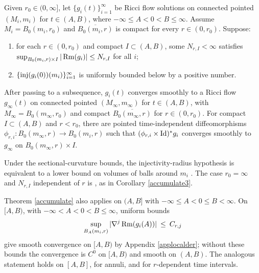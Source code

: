 \begin{theorem}
  \label{thm:kl-convergent-subsequences-ricci-flow-solutions-existence-convergent-subsequences-ricci-flow-solutions}
\label{accumulate}

Given $r_0\in(0,\infty]$, let $\{g_i(t)\}_{i=1}^\infty$ be Ricci flow
solutions on connected pointed $(M_i,m_i)$ for
$t\in(A,B)$, where $-\infty\leq A<0<B\leq\infty$. Assume
$M_i=B_0(m_i,r_0)$ and $\overline{B_0(m_i,r)}$ is compact for every
$r\in(0,r_0)$. Suppose:
\begin{enumerate}
\item for each $r\in(0,r_0)$ and compact $I\subset(A,B)$, some
$N_{r,I}<\infty$ satisfies
$\sup_{B_0(m_i,r)\times I}|\operatorname{Rm}(g_i)|\leq N_{r,I}$ for all $i$;
\item $\{\operatorname{inj}(g_i(0))(m_i)\}_{i=1}^\infty$ is uniformly bounded below by a
positive number.
\end{enumerate}
After passing to a subsequence, $g_i(t)$ converges smoothly to a Ricci flow
$g_\infty(t)$ on connected pointed $(M_\infty,m_\infty)$ for
$t\in(A,B)$, with $M_\infty=B_0(m_\infty,r_0)$ and compact
$\overline{B_0(m_\infty,r)}$ for $r\in(0,r_0)$. For compact
$I\subset(A,B)$ and $r<r_0$, there are pointed time-independent
diffeomorphisms $\phi_{r,i}:B_0(m_\infty,r)\rightarrow B_0(m_i,r)$ such that
$(\phi_{r,i}\times\operatorname{Id})^*g_i$ converges smoothly to $g_\infty$ on
$B_0(m_\infty,r)\times I$.
\end{theorem}

Under the sectional-curvature bounds, the injectivity-radius hypothesis is
equivalent to a lower bound on volumes of balls around $m_i$
\cite[Theorem 4.7]{Cheeger-Gromov-Taylor}. The case $r_0=\infty$ and
$N_{r,I}$ independent of $r$ is \cite[Main Theorem]{Hamiltonnn}, as in
Corollary \ref{accumulate3}.

Theorem \ref{accumulate} also applies on $(A,B]$ with
$-\infty\leq A<0\leq B<\infty$. On $[A,B)$, with
$-\infty<A<0<B\leq\infty$, uniform bounds
\begin{equation}
\sup_{B_A(m_i,r)}|\nabla^j\operatorname{Rm}(g_i(A))|\: \le \:C_{r,j}
\end{equation}
give smooth convergence on $[A,B)$ by Appendix \ref{applocalder}; without
these bounds the convergence is $C^0$ on $[A,B)$ and smooth on $(A,B)$.
The analogous statement holds on $[A,B]$, for annuli, and for
$r$-dependent time intervals.

